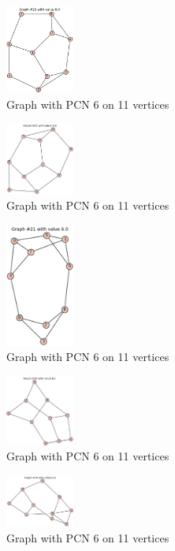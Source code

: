 \documentclass[12pt,a4paper]{amsart}
\theoremstyle{definition}
\theoremstyle{plain}
\begin{document}
\begin{figure}[h]
    \centering
    \includegraphics[width=0.2\textwidth]{Images/21}
    \caption{Graph with PCN 6 on 11 vertices}
\end{figure}
\begin{figure}[h]
    \centering
    \includegraphics[width=0.2\textwidth]{Images/22}
    \caption{Graph with PCN 6 on 11 vertices}
\end{figure}
\begin{figure}[h]
    \centering
    \includegraphics[width=0.2\textwidth]{Images/23}
    \caption{Graph with PCN 6 on 11 vertices}
\end{figure}
\begin{figure}[h]
    \centering
    \includegraphics[width=0.2\textwidth]{Images/24}
    \caption{Graph with PCN 6 on 11 vertices}
\end{figure}
\begin{figure}[h]
    \centering
    \includegraphics[width=0.2\textwidth]{Images/25}
    \caption{Graph with PCN 6 on 11 vertices}
\end{figure}
\end{document}
